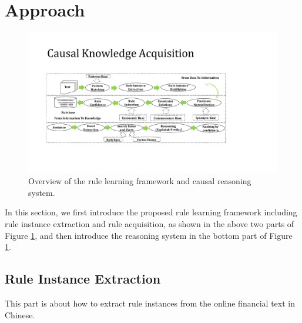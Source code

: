 \section{Approach}
\label{sec:approach}
\begin{figure}[htbp]
	\centering
	\includegraphics[width=\textwidth]{figures/learning_reasoning}
	\caption{Overview of the rule learning framework and causal reasoning system.}
	\label{fig:approach}
\end{figure}
In this section, we first introduce the proposed rule learning framework including rule instance extraction and rule acquisition, as shown in the above two parts of Figure \ref{fig:approach}, and then introduce the reasoning system in the bottom part of Figure \ref{fig:approach}.
\subsection{Rule Instance Extraction}
This part is about how to extract rule instances from the online financial text in Chinese.

